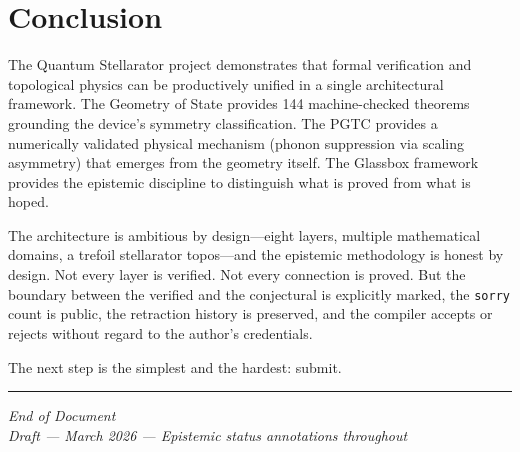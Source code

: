 \documentclass[12pt,letterpaper]{report}
\newcommand{\ruledline}{%
  \par\vspace{12pt}%
  {\centering\color{lightgray}\rule{0.4\textwidth}{0.5pt}\par}%
  \vspace{12pt}%
}
\begin{document}

\chapter{Conclusion}

The Quantum Stellarator project demonstrates that formal verification and topological physics can be productively unified in a single architectural framework. The Geometry of State provides 144 machine-checked theorems grounding the device's symmetry classification. The PGTC provides a numerically validated physical mechanism (phonon suppression via scaling asymmetry) that emerges from the geometry itself. The Glassbox framework provides the epistemic discipline to distinguish what is proved from what is hoped.

The architecture is ambitious by design---eight layers, multiple mathematical domains, a trefoil stellarator topos---and the epistemic methodology is honest by design. Not every layer is verified. Not every connection is proved. But the boundary between the verified and the conjectural is explicitly marked, the \texttt{sorry} count is public, the retraction history is preserved, and the compiler accepts or rejects without regard to the author's credentials.

The next step is the simplest and the hardest: submit.

\ruledline

\vfill
\begin{center}
{\small\itshape\color{gray} End of Document\\
Draft --- March 2026 --- Epistemic status annotations throughout}
\end{center}
\end{document}
